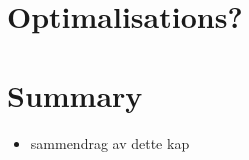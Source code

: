 \section{Optimalisations?}

\section{Summary}
\label{sect:impl:summary}
\begin{itemize}
  \item sammendrag av dette kap
\end{itemize}